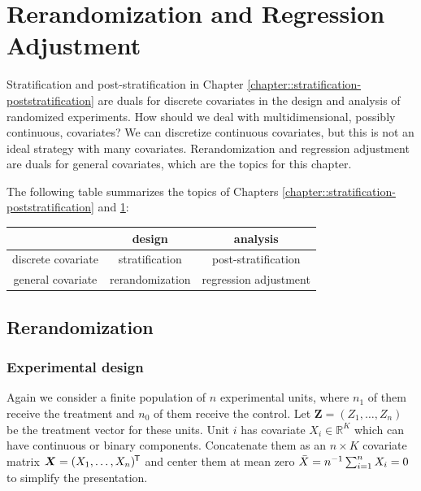 
\chapter{Rerandomization and Regression Adjustment}
 \label{chapter:rerandomization-regression}


Stratification and post-stratification in Chapter  \ref{chapter::stratification-poststratification} are duals for discrete covariates in the design and analysis of randomized experiments.  How should we deal with multidimensional, possibly continuous, covariates? We can discretize continuous covariates, but this is not an ideal strategy with many covariates. Rerandomization and regression adjustment are duals for general covariates, which are the topics for this chapter. 


The following table summarizes the topics of Chapters  \ref{chapter::stratification-poststratification} and \ref{chapter:rerandomization-regression}:


\begin{center}
\begin{tabular}{c|c|c}
\hline 
 & design & analysis \\ 
 \hline 
 discrete covariate & stratification & post-stratification \\
 \hline 
 general covariate & rerandomization & regression adjustment \\
 \hline 
 \end{tabular}
\end{center}





\section{Rerandomization}

\subsection{Experimental design}
Again we consider a finite population of $n$ experimental units, where $n_1$ of them receive the treatment and $n_0$ of them receive the control. Let
 $\bm{Z} = (Z_1,\ldots, Z_n)$ be the treatment vector for these units. Unit $i$ has covariate $X_i \in \mathbb{R}^K$ which can have continuous or binary components. Concatenate them as an $n\times K$ covariate matrix $\bm{X} = (X_1 , \ldots, X_n )  ^{\mkern-1.5mu\mathsf{T}}$ and center them at mean zero $\bar{X}  = n^{-1} \sum_{i=1}^n X_i = 0$ to simplify the presentation. 

